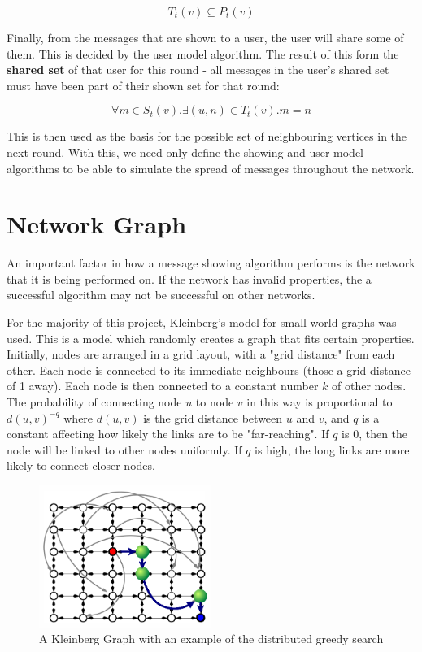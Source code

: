 \documentclass[bsc,frontabs,twoside,singlespacing,parskip,deptreport]{infthesis}     %
\begin{document}
\begin{equation}
T_{t}(v) \subseteq P_{t}(v)
\end{equation}

Finally, from the messages that are shown to a user, the user will share some of them. This is decided by the user model algorithm. The result of this form the \textbf{shared set} of that user for this round - all messages in the user's shared set must have been part of their shown set for that round:

\begin{equation}
\forall m \in S_{t}(v) . \exists (u, n) \in T_{t}(v) . m = n
\end{equation}

This is then used as the basis for the possible set of neighbouring vertices in the next round. With this, we need only define the showing and user model algorithms to be able to simulate the spread of messages throughout the network.

\section{Network Graph}
An important factor in how a message showing algorithm performs is the network that it is being performed on. If the network has invalid properties, the a successful algorithm may not be successful on other networks.

For the majority of this project, Kleinberg's model for small world graphs was used\cite{Kleinberg00}. This is a model which randomly creates a graph that fits certain properties. Initially, nodes are arranged in a grid layout, with a "grid distance" from each other. Each node is connected to its immediate neighbours (those a grid distance of 1 away). Each node is then connected to a constant number $k$ of other nodes. The probability of connecting node $u$ to node $v$ in this way is proportional to $d(u, v)^{-q}$ where $d(u, v)$ is the grid distance between $u$ and $v$, and $q$ is a constant affecting how likely the links are to be "far-reaching". If $q$ is 0, then the node will be linked to other nodes uniformly. If $q$ is high, the long links are more likely to connect closer nodes.

\begin{figure}[ht]
  \centering
    \includegraphics[width=0.5\textwidth]{Schabanel11_Kleinbergs_Network}
  \caption{A Kleinberg Graph with an example of the distributed greedy search\cite{Schabanel11}}
\end{figure}
\end{document}
